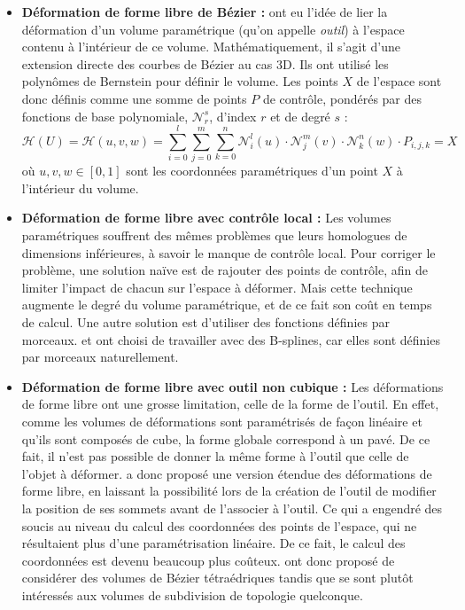 \begin{itemize}
\item{\textbf{Déformation de forme libre de Bézier :}} \cite{SP86} ont
  eu l'idée de lier la déformation d'un volume paramétrique (qu'on
  appelle \textit{outil}) à l'espace contenu à l'intérieur de ce
  volume. Mathématiquement, il s'agit d'une extension directe des
  courbes de Bézier au cas 3D. Ils ont utilisé les polynômes de
  Bernstein pour définir le volume. Les points $X$ de l'espace sont
  donc définis comme une somme de points $P$ de contrôle, pondérés par
  des fonctions de base polynomiale, $\mathcal{N}_r^s$, d'index $r$ et
  de degré $s$ :
  \begin{equation}
    \mathcal{H}(U) = \mathcal{H}(u,v,w) = 
    \sum_{i=0}^l \sum_{j=0}^m \sum_{k=0}^n
    \mathcal{N}_i^l(u) \cdot \mathcal{N}_j^m(v) \cdot \mathcal{N}_k^n(w) \cdot P_{i,j,k} = X
  \end{equation}
  où $u,v,w \in [0,1]$ sont les coordonnées paramétriques d'un point
  $X$ à l'intérieur du volume.
\item{\textbf{Déformation de forme libre avec contrôle local :}} Les
  volumes paramétriques souffrent des mêmes problèmes que leurs
  homologues de dimensions inférieures, à savoir le manque de contrôle
  local. Pour corriger le problème, une solution naïve est de rajouter
  des points de contrôle, afin de limiter l'impact de chacun sur
  l'espace à déformer. Mais cette technique augmente le degré du
  volume paramétrique, et de ce fait son coût en temps de calcul. Une
  autre solution est d'utiliser des fonctions définies par
  morceaux. \cite{GP89} et \cite{Com89} ont choisi de travailler avec
  des B-splines, car elles sont définies par morceaux naturellement.
\item{\textbf{Déformation de forme libre avec outil non cubique :}}
  Les déformations de forme libre ont une grosse limitation, celle de
  la forme de l'outil. En effet, comme les volumes de déformations
  sont paramétrisés de façon linéaire et qu'ils sont composés de cube,
  la forme globale correspond à un pavé. De ce fait, il n'est pas
  possible de donner la même forme à l'outil que celle de l'objet à
  déformer. \cite{Coq90} a donc proposé une version étendue des
  déformations de forme libre, en laissant la possibilité lors de la
  création de l'outil de modifier la position de ses sommets avant de
  l'associer à l'outil. Ce qui a engendré des soucis au niveau du
  calcul des coordonnées des points de l'espace, qui ne résultaient
  plus d'une paramétrisation linéaire. De ce fait, le calcul des
  coordonnées est devenu beaucoup plus coûteux. \cite{BBT97} ont donc
  proposé de considérer des volumes de Bézier tétraédriques tandis que
  \cite{MJ96} se sont plutôt intéressés aux volumes de subdivision de
  topologie quelconque.
\end{itemize}

